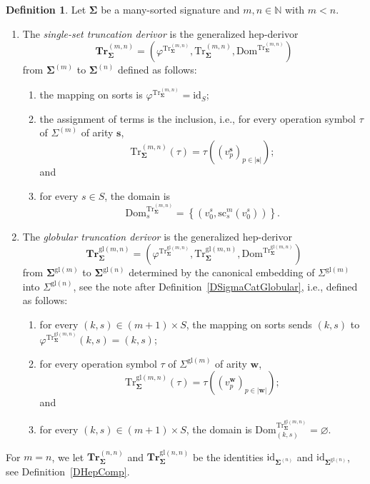 \documentclass[a4paper, reqno
]{amsart}
\newcommand{\bb}[1]{\ensuremath{\lvert #1 \rvert}}
\newcommand{\sig}[1]{\mathbf{#1}}             %
\newcommand{\Dom}{\mathrm{Dom}}
\newcommand{\id}{\mathrm{id}}
\newcommand{\gl}{\mathrm{gl}}                %
\newcommand{\src}{\mathrm{sc}}
\newcommand{\Tr}{\mathrm{Tr}}
\newcommand{\bTr}{\mathbf{Tr}}
\theoremstyle{plain}
\theoremstyle{definition}
\newtheorem{definition}[theorem]{Definition}
\begin{document}
\begin{definition}\label{DTruncDerivor}
Let $\sig{\Sigma}$ be a many-sorted signature and $m,n\in\mathbb{N}$ with $m<n$.
\begin{enumerate}
\item The \emph{single-set truncation derivor} is the generalized hep-derivor
$$
\bTr^{(m,n)}_{\sig{\Sigma}}=\left(\varphi^{\Tr^{(m,n)}_{\sig{\Sigma}}},\Tr^{(m,n)}_{\sig{\Sigma}},\Dom^{\Tr^{(m,n)}_{\sig{\Sigma}}}\right)
$$
from $\sig{\Sigma}^{(m)}$ to $\sig{\Sigma}^{(n)}$ defined as follows:
\begin{enumerate}
\item the mapping on sorts is $\varphi^{\Tr^{(m,n)}_{\sig{\Sigma}}}=\id_{S}$;
\item the assignment of terms is the inclusion, i.e., for every operation symbol $\tau$ of $\Sigma^{(m)}$ of arity $\mathbf{s}$,
$$
\Tr^{(m,n)}_{\sig{\Sigma}}(\tau)=\tau((v^{\mathbf{s}}_{p})_{p\in\bb{\mathbf{s}}});
$$
and
\item for every $s\in S$, the domain is
$$
\Dom^{\Tr^{(m,n)}_{\sig{\Sigma}}}_{s}=\left\lbrace\left(v^{s}_{0},\src^{m}_{s}(v^{s}_{0})\right)\right\rbrace.
$$
\end{enumerate}
\item The \emph{globular truncation derivor} is the generalized hep-derivor
$$
\bTr^{\gl(m,n)}_{\sig{\Sigma}}=\left(\varphi^{\Tr^{\gl(m,n)}_{\sig{\Sigma}}},\Tr^{\gl(m,n)}_{\sig{\Sigma}},\Dom^{\Tr^{\gl(m,n)}_{\sig{\Sigma}}}\right)
$$
from $\sig{\Sigma}^{\gl(m)}$ to $\sig{\Sigma}^{\gl(n)}$ determined by the canonical embedding of $\Sigma^{\gl(m)}$ into $\Sigma^{\gl(n)}$, see the note after Definition~\ref{DSigmaCatGlobular}, i.e., defined as follows:
\begin{enumerate}
\item for every $(k,s)\in(m+1)\times S$, the mapping on sorts sends $(k,s)$ to $\varphi^{\Tr^{\gl(m,n)}_{\sig{\Sigma}}}(k,s)=(k,s)$;
\item for every operation symbol $\tau$ of $\Sigma^{\gl(m)}$ of arity $\mathbf{w}$,
$$
\Tr^{\gl(m,n)}_{\sig{\Sigma}}(\tau)=\tau((v^{\mathbf{w}}_{p})_{p\in\bb{\mathbf{w}}});
$$
and
\item for every $(k,s)\in(m+1)\times S$, the domain is $\Dom^{\Tr^{\gl(m,n)}_{\sig{\Sigma}}}_{(k,s)}=\varnothing$.
\end{enumerate}
\end{enumerate}
For $m=n$, we let $\bTr^{(n,n)}_{\sig{\Sigma}}$ and $\bTr^{\gl(n,n)}_{\sig{\Sigma}}$ be the identities $\id_{\sig{\Sigma}^{(n)}}$ and $\id_{\sig{\Sigma}^{\gl(n)}}$, see Definition~\ref{DHepComp}.
\end{definition}
\end{document}
